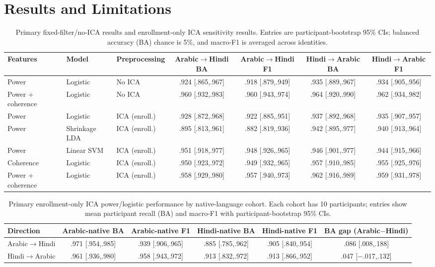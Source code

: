 \documentclass[conference]{IEEEtran}
\begin{document}
\section{Results and Limitations}
\begin{table}[t]
\centering\caption{Primary fixed-filter/no-ICA results and enrollment-only ICA sensitivity results. Entries are participant-bootstrap 95\% CIs; balanced accuracy (BA) chance is 5\%, and macro-F1 is averaged across identities.}
\label{tab:main}\small
\begin{tabular}{lllcccc}\toprule
Features & Model & Preprocessing & Arabic$\to$Hindi BA & Arabic$\to$Hindi F1 & Hindi$\to$Arabic BA & Hindi$\to$Arabic F1\\\midrule
Power & Logistic & No ICA & .924 [.865,.967] & .918 [.879,.949] & .935 [.889,.967] & .934 [.905,.956]\\
Power + coherence & Logistic & No ICA & .960 [.932,.983] & .960 [.943,.974] & .964 [.920,.990] & .962 [.934,.982]\\
Power & Logistic & ICA (enroll.) & .928 [.872,.968] & .922 [.885,.951] & .937 [.892,.968] & .935 [.907,.957]\\
Power & Shrinkage LDA & ICA (enroll.) & .895 [.813,.961] & .882 [.819,.936] & .942 [.895,.977] & .940 [.913,.964]\\
Power & Linear SVM & ICA (enroll.) & .951 [.918,.977] & .948 [.926,.965] & .946 [.901,.977] & .944 [.915,.966]\\
Coherence & Logistic & ICA (enroll.) & .950 [.923,.972] & .949 [.932,.965] & .957 [.910,.985] & .955 [.925,.976]\\
Power + coherence & Logistic & ICA (enroll.) & .958 [.929,.980] & .957 [.940,.973] & .962 [.916,.989] & .959 [.931,.978]\\\bottomrule
\end{tabular}
\end{table}

\begin{table}[t]
\centering\caption{Primary enrollment-only ICA power/logistic performance by native-language cohort. Each cohort has 10 participants; entries show mean participant recall (BA) and macro-F1 with participant-bootstrap 95\% CIs.}
\label{tab:cohort}\small
\begin{tabular}{lccccc}\toprule
Direction & Arabic-native BA & Arabic-native F1 & Hindi-native BA & Hindi-native F1 & BA gap (Arabic$-$Hindi)\\\midrule
Arabic$\to$Hindi & .971 [.954,.985] & .939 [.906,.965] & .885 [.785,.962] & .905 [.840,.954] & .086 [.008,.188]\\
Hindi$\to$Arabic & .961 [.936,.980] & .958 [.943,.972] & .913 [.832,.972] & .913 [.866,.952] & .047 [$-$.017,.132]\\\bottomrule
\end{tabular}
\end{table}
\end{document}
